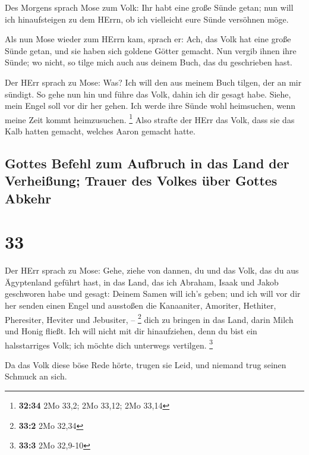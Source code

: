  Des Morgens sprach Mose zum Volk: Ihr habt eine große
Sünde getan; nun will ich hinaufsteigen zu dem HErrn, ob ich vielleicht
eure Sünde versöhnen möge.

 Als nun Mose wieder zum HErrn kam, sprach er: Ach, das
Volk hat eine große Sünde getan, und sie haben sich goldene Götter
gemacht.  Nun vergib ihnen ihre Sünde; wo nicht, so tilge
mich auch aus deinem Buch, das du geschrieben hast.

 Der HErr sprach zu Mose: Was? Ich will den aus meinem
Buch tilgen, der an mir sündigt.  So gehe nun hin und
führe das Volk, dahin ich dir gesagt habe. Siehe, mein Engel soll vor
dir her gehen. Ich werde ihre Sünde wohl heimsuchen, wenn meine Zeit
kommt heimzusuchen. \footnote{\textbf{32:34} 2Mo 33,2; 2Mo 33,12; 2Mo
  33,14}  Also strafte der HErr das Volk, dass sie das
Kalb hatten gemacht, welches Aaron gemacht hatte.

\hypertarget{gottes-befehl-zum-aufbruch-in-das-land-der-verheiuxdfung-trauer-des-volkes-uxfcber-gottes-abkehr}{%
\subsection{Gottes Befehl zum Aufbruch in das Land der Verheißung;
Trauer des Volkes über Gottes
Abkehr}\label{gottes-befehl-zum-aufbruch-in-das-land-der-verheiuxdfung-trauer-des-volkes-uxfcber-gottes-abkehr}}

\hypertarget{section-32}{%
\section{33}\label{section-32}}

 Der HErr sprach zu Mose: Gehe, ziehe von dannen, du und
das Volk, das du aus Ägyptenland geführt hast, in das Land, das ich
Abraham, Isaak und Jakob geschworen habe und gesagt: Deinem Samen will
ich's geben;  und ich will vor dir her senden einen Engel
und ausstoßen die Kanaaniter, Amoriter, Hethiter, Pheresiter, Heviter
und Jebusiter, -- \footnote{\textbf{33:2} 2Mo 32,34}  dich
zu bringen in das Land, darin Milch und Honig fließt. Ich will nicht mit
dir hinaufziehen, denn du bist ein halsstarriges Volk; ich möchte dich
unterwegs vertilgen. \footnote{\textbf{33:3} 2Mo 32,9-10}

 Da das Volk diese böse Rede hörte, trugen sie Leid, und
niemand trug seinen Schmuck an sich.

